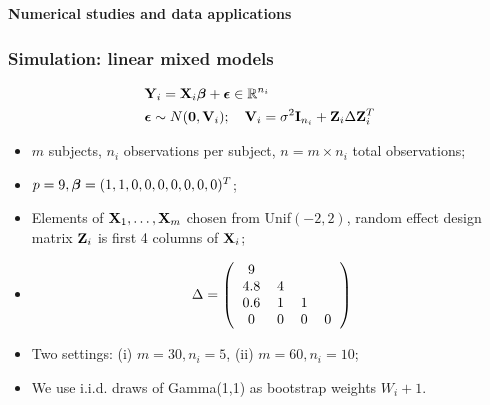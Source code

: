 \documentclass[handout,10pt]{beamer}
\begin{document}

\begin{frame}
\centering\huge
\textcolor{UniBlue}{\textbf{Numerical studies and data applications}}
\end{frame}


\begin{frame}
\frametitle{Simulation: linear mixed models}

\begin{align*}
& {\mathbf{Y}}_i = {\mathbf{X}}_i {\boldsymbol{\beta}} + {\boldsymbol{\epsilon}} \in {\mathbb{R}}^{n_i} \\
& {\boldsymbol{\epsilon}} \sim N ({\bf 0}, {\mathbf{V}}_i) ; \quad {\mathbf{V}}_i = \sigma^2 {\mathbf{I}}_{n_i} + {\mathbf{Z}}_i \Delta {\mathbf{Z}}_i^T
\end{align*}

\begin{itemize}
\item $m$ subjects, $n_i$ observations per subject, $n = m \times n_i$ total observations;

\item $p = 9, {\boldsymbol{\beta}} = (1,1,0,0,0,0,0,0,0)^T$;

\item Elements of ${\mathbf{X}}_1, \ldots, {\mathbf{X}}_m$ chosen from Unif$(-2,2)$, random effect design matrix ${\mathbf{Z}}_i$ is first 4 columns of ${\mathbf{X}}_i$;

\item
%
$$ \Delta = \left(
	\begin{tabular}{cccc}
		9 & ~ & ~ & ~\\
		4.8 & 4 & ~ & ~\\
		0.6 & 1 & 1 & ~\\
		0 & 0 & 0 & 0\\
	\end{tabular}
	\right) $$
%
\item Two settings: (i) $m = 30, n_i=5$, (ii) $m = 60, n_i = 10$;

\item We use i.i.d. draws of Gamma(1,1) as bootstrap weights $W_i+1$.

\end{itemize}

\end{frame}
\end{document}
